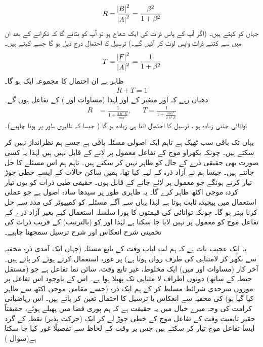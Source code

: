 \begin{align}
R=\frac{\abs B^{2}}{\abs A^{2}}=\frac{\beta^{2}}{1+\beta^{2}}
\end{align}
جہاں کو کہتے ہیں۔ (اگر آپ کے پاس ذرات کی ایک شعاع ہو تو  آپ کو بتائے گا کہ ٹکرانے کے بعد ان میں سے کتنے ذرات واپس لوٹ کر آئیں گے۔) ترسیل کا احتمال درج ذیل ہو گا جسے کہتے ہیں۔
\begin{align}
T=\frac{\abs F^{2}}{\abs A^{2}}=\frac{1}{1+\beta^{2}}
\end{align}
 ظاہر ہے ان احتمال کا مجموعہ ایک  ہو گا۔
 \begin{align}
 R+T=1
 \end{align}
 دھیان رہے کہ  اور  متغیر  کے اور لہٰذا (مساوات  اور )  کے تفاعل ہوں گے۔
 \begin{align}\label{مساوات_شروڈنگر_انعکاس_ترسیل_مستقل}
 R&=\frac{1}{1+\tfrac{2\hslash^{2}E}{m\alpha^{2}}},&& T =\frac{1}{1+\tfrac{m\alpha^{2}}{2\hslash^{2}E}}
 \end{align} 
توانائی جتنی زیادہ ہو ، ترسیل کا احتمال اتنا ہی زیادہ ہو گا ( جیسا کہ ظاہری طور پر ہونا چاہیے)۔ 
 
 یہاں تک باقی سب ٹھیک ہے تاہم ایک اصولی مسئلہ باقی ہے جسے ہم نظرانداز نہیں کر سکتے ہیں۔ چونکہ بکھراو موج کے تفاعل معمول پر لانے کے قابل نہیں ہیں لہٰذا یہ کسی صورت بھی حقیقی ذرے کے حال کو ظاہر نہیں کر سکتے ہیں۔ تاہم ہم اس مسئلے کا حل جانتے ہیں۔ جیسا ہم نے آزاد ذرہ کے لیے کیا تھا، ہمیں ساکن حالات کے ایسے خطی جوڑ تیار کرنے ہونگے جو معمول پر لائے جانے کے قابل ہوں۔ حقیقی طبی ذرات کو یوں تیار کردہ موجی اکٹھ ظاہر کرے گا۔ یہ ظاہری طور پر سیدھا سادہ اصول ہے جو عملی استعمال میں پیچیدہ ثابت ہوتا ہے لہٰذا یہاں سے آگے مسئلے کو کمپیوٹر کی مدد سے حل کرنا بہتر ہو گا۔ چونکہ توانائی کی قیمتوں کا پورا سلسلہ استعمال کیے بغیر آزاد ذرے کے تفاعل موج کو معمول پر نہیں لایا جا سکتا ہے لہٰذا  اور  کو (بالترتیب)  کے قریب ذرات کی تخمینی شرح انعکاس اور شرح ترسیل سمجھنا چاہیے۔ 
 
 یہ ایک عجیب بات ہے کہ ہم لب لباب وقت کے تابع مسئلہ (جہاں ایک آمدی ذرہ مخفیہ سے بکھر کر لامتناہی کی طرف رواں ہوتا ہے) پر غور،   استعمال کرتے ہوئے کر پاتے ہیں۔ آخر کار (مساوات  اور  میں) ایک مخلوط، غیر تابع وقت، سائن نما تفاعل ہے جو (مستقل حیطہ کے ساتھ) دونوں اطراف لا متناہی تک پھیلا ہوا ہے۔ اس کے باوجود اس تفاعل پر موزوں سرحدی شرائط مسلط کر کے ہم ایک ذرہ (جسے مقامی موجی اکٹھ سے ظاہر کیا گیا ہو) کی مخفیہ سے انعکاس یا ترسیل کا احتمال تعین کر پاتے ہیں۔ اس ریاضیاتی کرامت کی وجہ میرے خیال میں یہ حقیقت ہے کہ ہم پوری فضا میں پھیلے ہوئے، حقیقتاً حقیر تابعیت وقت کے  تفاعل موج کے خطی جوڑ لے کر ایک (حرکت پذیر) نقطہ کے گرد ایسا تفاعل موج تیار کر سکتے ہیں جس پر وقت کے لحاظ سے تفصیلًا غور کیا جا سکتا ہے(سوال )
 
